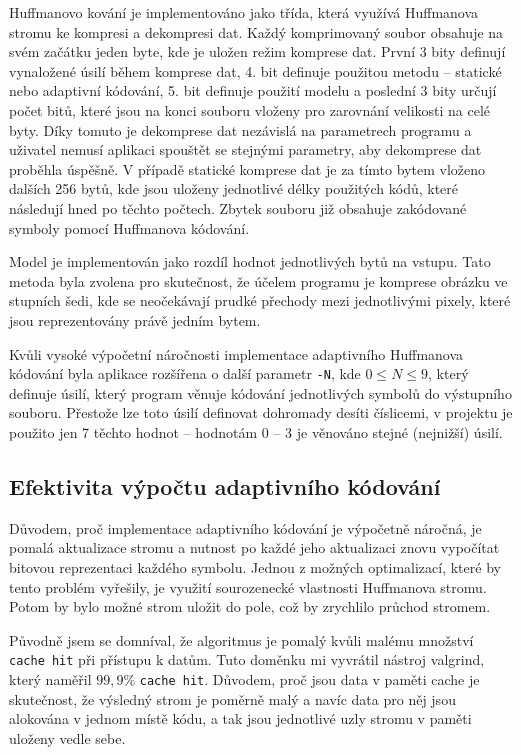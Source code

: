 \documentclass[11pt,a4paper,titlepage]{article}
\begin{document}
        Huffmanovo kování je implementováno jako třída, která využívá Huffmanova stromu ke kompresi a dekompresi dat. Každý komprimovaný soubor obsahuje
        na svém začátku jeden byte, kde je uložen režim komprese dat. První 3 bity definují vynaložené úsilí během komprese dat, 4. bit definuje
        použitou metodu -- statické nebo adaptivní kódování, 5. bit definuje použití modelu a poslední 3 bity určují počet bitů, které jsou na konci souboru vloženy pro zarovnání velikosti
        na celé byty. Díky tomuto je dekomprese dat nezávislá na parametrech programu a uživatel nemusí aplikaci spouštět se stejnými parametry, aby
        dekomprese dat proběhla úspěšně. V případě statické komprese dat je za tímto bytem vloženo dalších 256 bytů, kde jsou uloženy jednotlivé délky
        použitých kódů, které následují hned po těchto počtech. Zbytek souboru již obsahuje zakódované symboly pomocí Huffmanova kódování.

        Model je implementován jako rozdíl hodnot jednotlivých bytů na vstupu. Tato metoda byla zvolena pro skutečnost, že účelem programu je
        komprese obrázku ve stupních šedi, kde se neočekávají prudké přechody mezi jednotlivými pixely, které jsou reprezentovány právě jedním
        bytem.

        Kvůli vysoké výpočetní náročnosti implementace adaptivního Huffmanova kódování byla aplikace rozšířena o další parametr \texttt{-N}, kde $0 \leq N \leq 9$,
        který definuje úsilí, který program věnuje kódování jednotlivých symbolů do výstupního souboru. Přestože lze toto úsilí definovat dohromady desíti
        číslicemi, v projektu je použito jen 7 těchto hodnot -- hodnotám 0 -- 3 je věnováno stejné (nejnižší) úsilí.

        \subsection{Efektivita výpočtu adaptivního kódování}
            Důvodem, proč implementace adaptivního kódování je výpočetně náročná, je pomalá aktualizace stromu a nutnost
            po každé jeho aktualizaci znovu vypočítat bitovou reprezentaci každého symbolu. Jednou z možných optimalizací,
            které by tento problém vyřešily, je využití sourozenecké vlastnosti Huffmanova stromu. Potom by bylo možné strom
            uložit do pole, což by zrychlilo průchod stromem.

            Původně jsem se domníval, že algoritmus je pomalý kvůli malému množství \texttt{cache hit} při přístupu k datům. Tuto doměnku
            mi vyvrátil nástroj valgrind, který naměřil $99,9\%$ \texttt{cache hit}. Důvodem, proč jsou data v paměti cache je skutečnost,
            že výsledný strom je poměrně malý a navíc data pro něj jsou alokována v jednom místě kódu, a tak jsou jednotlivé uzly stromu v paměti uloženy
            vedle sebe.
\end{document}
